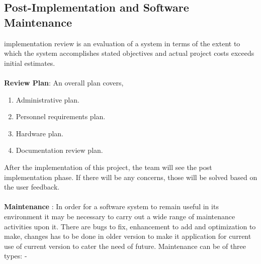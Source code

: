 \subsection{Post-Implementation and Software Maintenance}
implementation review is an evaluation of a system in terms of the extent to which the system
accomplishes stated objectives and actual project costs exceeds initial estimates.\\\\
{\bf Review Plan}: An overall plan covers,\\
\begin{enumerate}
\item Administrative plan.
\item Personnel requirements plan.
\item Hardware plan.
\item Documentation review plan.
\end{enumerate}
\vskip 0.5cm
After the implementation of this project, the team will see the post implementation phase. If there will be
any concerns, those will be solved based on the user feedback.\\\\
{\bf Maintenance} : In order for a software system to remain useful in its environment it may be necessary to
carry out a wide range of maintenance activities upon it. There are bugs to fix, enhancement to add and
optimization to make, changes has to be done in older version to make it application for current use of
current version to cater the need of future. Maintenance can be of three types: -\\
